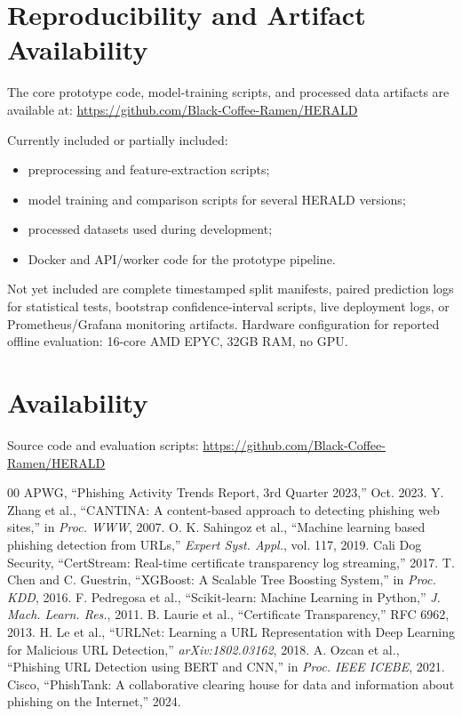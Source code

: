 \documentclass[conference]{IEEEtran}
\begin{document}
\section*{Reproducibility and Artifact Availability}

The core prototype code, model-training scripts, and processed data artifacts are available at:
\url{https://github.com/Black-Coffee-Ramen/HERALD}

Currently included or partially included:
\begin{itemize}
    \item preprocessing and feature-extraction scripts;
    \item model training and comparison scripts for several HERALD versions;
    \item processed datasets used during development;
    \item Docker and API/worker code for the prototype pipeline.
\end{itemize}

Not yet included are complete timestamped split manifests, paired prediction logs for statistical tests, bootstrap confidence-interval scripts, live deployment logs, or Prometheus/Grafana monitoring artifacts. Hardware configuration for reported offline evaluation: 16-core AMD EPYC, 32GB RAM, no GPU.

\section*{Availability}
Source code and evaluation scripts: \url{https://github.com/Black-Coffee-Ramen/HERALD}

\begin{thebibliography}{00}
 APWG, ``Phishing Activity Trends Report, 3rd Quarter 2023,'' Oct. 2023.
 Y. Zhang et al., ``CANTINA: A content-based approach to detecting phishing web sites,'' in \textit{Proc. WWW}, 2007.
 O. K. Sahingoz et al., ``Machine learning based phishing detection from URLs,'' \textit{Expert Syst. Appl.}, vol. 117, 2019.
 Cali Dog Security, ``CertStream: Real-time certificate transparency log streaming,'' 2017.
 T. Chen and C. Guestrin, ``XGBoost: A Scalable Tree Boosting System,'' in \textit{Proc. KDD}, 2016.
 F. Pedregosa et al., ``Scikit-learn: Machine Learning in Python,'' \textit{J. Mach. Learn. Res.}, 2011.
 B. Laurie et al., ``Certificate Transparency,'' RFC 6962, 2013.
 H. Le et al., ``URLNet: Learning a URL Representation with Deep Learning for Malicious URL Detection,'' \textit{arXiv:1802.03162}, 2018.
 A. Ozcan et al., ``Phishing URL Detection using BERT and CNN,'' in \textit{Proc. IEEE ICEBE}, 2021.
 Cisco, ``PhishTank: A collaborative clearing house for data and information about phishing on the Internet,'' 2024.
\end{thebibliography}
\end{document}
